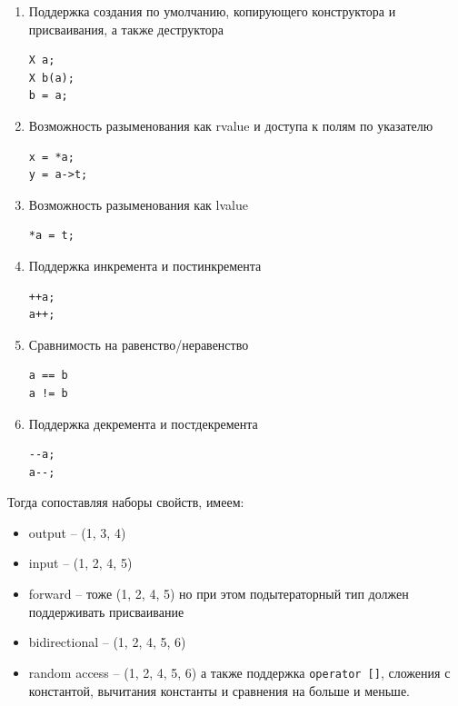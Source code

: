 \documentclass[a4paper,12pt,oneside]{article}
\begin{document}
\begin {enumerate}
\item
Поддержка создания по умолчанию, копирующего конструктора и присваивания, а также деструктора

\begin{lstlisting}
X a;
X b(a);
b = a;
\end{lstlisting}

\item
Возможность разыменования как rvalue и доступа к полям по указателю

\begin{lstlisting}
x = *a;
y = a->t;
\end{lstlisting}

\item
Возможность разыменования как lvalue

\begin{lstlisting}
*a = t;
\end{lstlisting}

\item
Поддержка инкремента и постинкремента

\begin{lstlisting}
++a;
a++;
\end{lstlisting}

\item
Сравнимость на равенство/неравенство

\begin{lstlisting}
a == b
a != b
\end{lstlisting}

\item
Поддержка декремента и постдекремента

\begin{lstlisting}
--a;
a--;
\end{lstlisting}

\end {enumerate}

Тогда сопоставляя наборы свойств, имеем:

\begin {itemize}
\item output -- (1, 3, 4)
\item input -- (1, 2, 4, 5)
\item forward -- тоже (1, 2, 4, 5) но при этом подытераторный тип должен поддерживать присваивание
\item bidirectional -- (1, 2, 4, 5, 6)
\item random access -- (1, 2, 4, 5, 6) а также поддержка \lstinline!operator []!, сложения с константой, вычитания константы и сравнения на больше и меньше.
\end {itemize}
\end{document}
